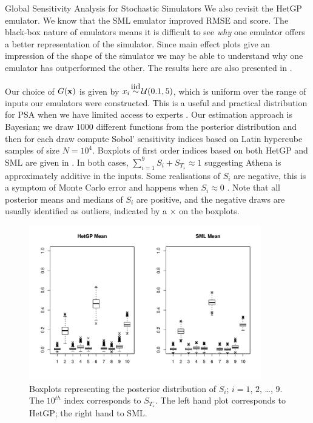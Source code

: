 \begin{chapter}{Global Sensitivity Analysis for Stochastic Simulators\label{Ch:sensitivity}}
We also revisit the HetGP emulator. We know that the SML emulator improved RMSE and score. The black-box nature of emulators means it is difficult to see \textit{why} one emulator offers a better representation of the simulator. Since main effect plots give an impression of the shape of the simulator we may be able to understand why one emulator has outperformed the other. The results here are also presented in \citet{Kennedy2023}.

Our choice of $G(\mathbf{x})$ is given by $x_i \iid \mathcal{U}(0.1, 5)$, which is uniform over the range of inputs our emulators were constructed. This is a useful and practical distribution for PSA when we have limited access to experts \citep{Saisana2005,Overstall2016}. Our estimation approach is Bayesian; we draw $1000$ different functions from the posterior distribution and then for each draw compute Sobol' sensitivity indices based on Latin hypercube samples of size $N=10^4$. Boxplots of first order indices based on both HetGP and SML are given in . In both cases, $\sum_{i=1}^9S_i + S_{T_\varepsilon}\approx 1$ suggesting Athena is approximately additive in the inputs. Some realisations of $S_i$ are negative, this is a symptom of Monte Carlo error and happens when $S_i \approx 0$ \citep{Gramacy2020surrogates}. Note that all posterior means and medians of $S_i$ are positive, and the negative draws are usually identified as outliers, indicated by a $\times$ on the boxplots.
\begin{figure}[ht]
   \centering
   \includegraphics[width=0.9\textwidth]{fig-sensitivity/si-mean4.pdf}
   \caption{Boxplots representing the posterior distribution of $S_i$; $i=1$, $2$, \ldots, $9$. The $10^{th}$ index corresponds to $S_{T_\varepsilon}$. The left hand plot corresponds to HetGP; the right hand to SML.}  \label{Fig:si-mean}

\end{figure}
\end{chapter}
